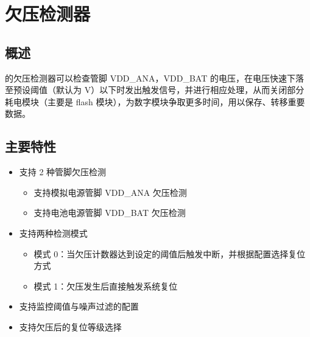 \documentclass[main\_\_CN.tex]{subfiles}
\begin{document}

\ifglobal
\else
    {\let\clearpage\relax \listoftodos}
    {\let\clearpage\relax \listofdonetodos}
    \tableofcontents
\fi



\hypertarget{brownout}{}
\chapter{欠压检测器}
\label{mod:brownout}




\section{概述}

\chipname{} 的欠压检测器可以检查管脚 VDD\_ANA，VDD\_BAT 的电压，在电压快速下落至预设阈值（默认为   V）以下时发出触发信号，并进行相应处理，从而关闭部分耗电模块（主要是 flash 模块），为数字模块争取更多时间，用以保存、转移重要数据。


\section{主要特性}
\label{sec:brownout-features}

\begin{itemize}
    \item 支持 2 种管脚欠压检测
       \begin{itemize}
        \item 支持模拟电源管脚 VDD\_ANA 欠压检测
        \item 支持电池电源管脚 VDD\_BAT 欠压检测
    \end{itemize}
    \item 支持两种检测模式
        \begin{itemize}
        \item 模式 0：当欠压计数器达到设定的阈值后触发中断，并根据配置选择复位方式
        \item 模式 1：欠压发生后直接触发系统复位
    \end{itemize}
    \item 支持监控阈值与噪声过滤的配置
    \item 支持欠压后的复位等级选择
\end{itemize}
\end{document}
